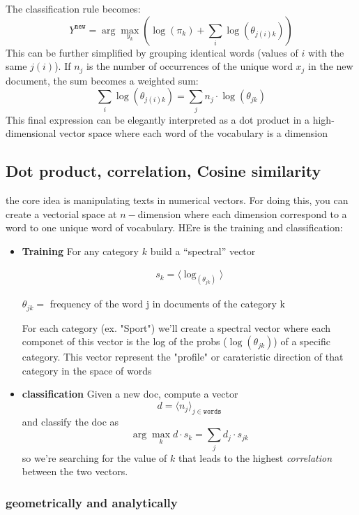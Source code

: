 The classification rule becomes:
\[
  Y^{\texttt{new}} = \arg\max_{y_k} \left( \log(\pi_k) + \sum_i \log(\theta_{j(i)k}) \right)
\]
This can be further simplified by grouping identical words (values of $ i $ with the same $ j(i) $). If $n_j$ is the number of occurrences of the unique word $x_j$ in the new document, the sum becomes a weighted sum:
\[
  \sum_i \log(\theta_{j(i)k}) = \sum_j n_j \cdot \log(\theta_{jk})
\]
This final expression can be elegantly interpreted as a dot product in a high-dimensional vector space where each word of the vocabulary is a dimension

\subsection{Dot product, correlation, Cosine similarity}
the core idea is manipulating texts in numerical vectors. For doing this, you can create a vectorial space at $n-$dimension where each dimension correspond to a word to one unique word of vocabulary. HEre is the training and classification:
\begin{itemize}
    \item \textbf{Training}
    For any category $k$ build a “spectral” vector
    \begin{center}
        \begin{align*}
            s_k =\langle  \log_{(\theta_{jk})} \rangle
        \end{align*}
    \end{center}

    $\theta_{jk}=$ frequency of the word j in documents of the category k

    For each category (ex. "Sport") we'll create a spectral vector where each componet of this vector is the log of the probs ($\log{(\theta_{jk})}$) of a specific category. This vector represent the "profile" or carateristic direction of that category in the space of words

    
    \item \textbf{classification}
    Given a new doc, compute a vector
    \[
        d = \langle n_j \rangle_{j\in \texttt{words}}
    \]
    and classify the doc as
    \[
        \arg \max_k d\cdot s_k =\sum_{j}d_j\cdot s_{jk}
    \]
    so we're searching for the value of $ k $ that leads to the highest \textit{correlation} between the two vectors.
\end{itemize}

\subsubsection{geometrically and analytically}

